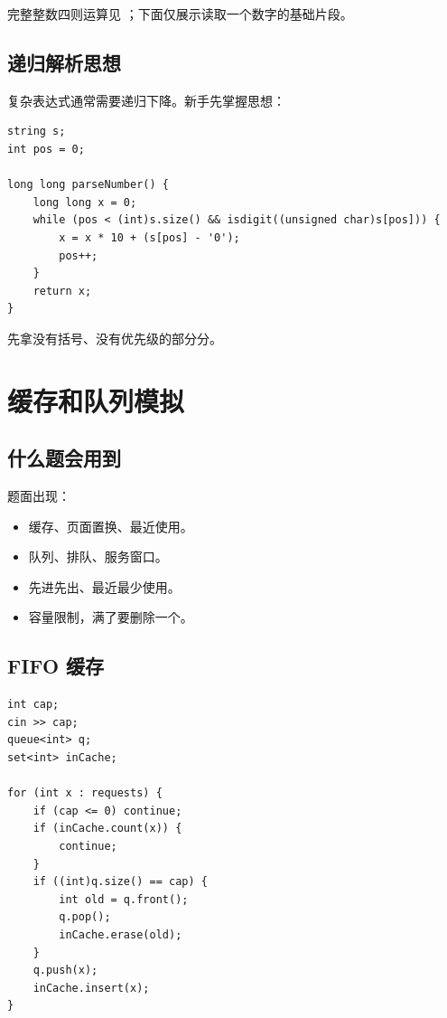完整整数四则运算见 ；下面仅展示读取一个数字的基础片段。

\subsection{递归解析思想}

复杂表达式通常需要递归下降。新手先掌握思想：

\begin{lstlisting}
string s;
int pos = 0;

long long parseNumber() {
    long long x = 0;
    while (pos < (int)s.size() && isdigit((unsigned char)s[pos])) {
        x = x * 10 + (s[pos] - '0');
        pos++;
    }
    return x;
}
\end{lstlisting}

先拿没有括号、没有优先级的部分分。

\section{缓存和队列模拟}\label{sec:07-23}

\subsection{什么题会用到}

题面出现：

\begin{itemize}
  \item 缓存、页面置换、最近使用。
  \item 队列、排队、服务窗口。
  \item 先进先出、最近最少使用。
  \item 容量限制，满了要删除一个。
\end{itemize}

\subsection{FIFO 缓存}

\begin{lstlisting}
int cap;
cin >> cap;
queue<int> q;
set<int> inCache;

for (int x : requests) {
    if (cap <= 0) continue;
    if (inCache.count(x)) {
        continue;
    }
    if ((int)q.size() == cap) {
        int old = q.front();
        q.pop();
        inCache.erase(old);
    }
    q.push(x);
    inCache.insert(x);
}
\end{lstlisting}


